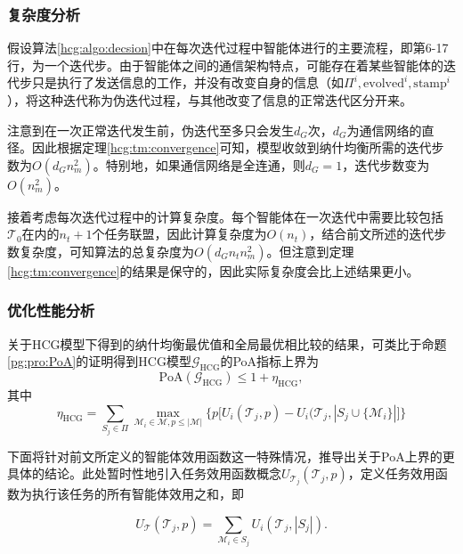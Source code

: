 %
\subsubsection{复杂度分析}
\label{perform:complexity}

假设算法\ref{hcg:algo:decsion}中在每次迭代过程中智能体进行的主要流程，即第6-17行，为一个迭代步。由于智能体之间的通信架构特点，可能存在着某些智能体的迭代步只是执行了发送信息的工作，并没有改变自身的信息（如$\Pi^i,\text{evolved}^i,\text{stamp}^i$），将这种迭代称为伪迭代过程，与其他改变了信息的正常迭代区分开来。

注意到在一次正常迭代发生前，伪迭代至多只会发生$d_G$次，$d_G$为通信网络的直径。因此根据定理\ref{hcg:tm:convergence}可知，模型收敛到纳什均衡所需的迭代步数为$O(d_G n_m^2)$。特别地，如果通信网络是全连通，则$d_G=1$，迭代步数变为$O(n_m^2)$。

接着考虑每次迭代过程中的计算复杂度。每个智能体在一次迭代中需要比较包括$\mathcal{T}_0$在内的$n_t+1$个任务联盟，因此计算复杂度为$O(n_t)$，结合前文所述的迭代步数复杂度，可知算法的总复杂度为$O(d_G n_t n_m^2)$。但注意到定理\ref{hcg:tm:convergence}的结果是保守的，因此实际复杂度会比上述结果更小。



\subsubsection{优化性能分析}
\label{perform:optimality}

关于HCG模型下得到的纳什均衡最优值和全局最优相比较的结果，可类比于命题\ref{pg:pro:PoA}的证明得到HCG模型$\mathcal{G}_{\text{HCG}}$的PoA指标上界为
\begin{equation}
\label{hcg:eq:PoA}
	\mathrm{PoA}(\mathcal{G}_{\text{HCG}}) \leq 1+\eta_{\text{HCG}},
\end{equation}
其中
\begin{equation}
\label{hcg:eq:eta}
	\eta_{\text{HCG}} = \sum_{S_j \in \Pi} \max_{\mathcal{M}_i \in \mathcal{M},p\leq |\mathcal{M}|} \big\{p \big[U_i(\mathcal{T}_j,p) - U_i(\mathcal{T}_j,|S_j \cup\{\mathcal{M}_i\}| \big] \big\}
\end{equation}

下面将针对前文所定义的智能体效用函数这一特殊情况，推导出关于PoA上界的更具体的结论。此处暂时性地引入任务效用函数概念$U_{\mathcal{T}_j}(\mathcal{T}_j,p)$，定义任务效用函数为执行该任务的所有智能体效用之和，即

\begin{equation}
\label{hcg:eq:taskU}
	U_{\mathcal{T}}(\mathcal{T}_j,p) = \sum_{\mathcal{M}_i \in S_j} U_i(\mathcal{T}_j,|S_j|).
\end{equation}

